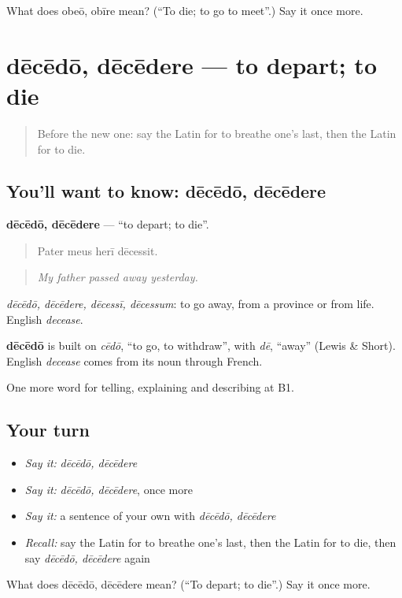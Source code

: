 \begin{tcolorbox}[breakable,colback=teal!4,colframe=teal!35!black,title={Before you move on}]
What does obeō, obīre mean? (\textquotedblleft{}To die; to go to meet\textquotedblright{}.) Say it once more.
\end{tcolorbox}
\section[dēcēdō, dēcēdere]{dēcēdō, dēcēdere — to depart; to die}

\label{lesson:LA-C329-decedo}



\begin{quote}
Before the new one: say the Latin for to breathe one's last, then the Latin for to die.
\end{quote}

\subsection*{You'll want to know: dēcēdō, dēcēdere}
\textbf{dēcēdō, dēcēdere} — \textquotedblleft{}to depart; to die\textquotedblright{}.

\begin{quote}
Pater meus herī dēcessit.
\end{quote}

\begin{quote}
\emph{My father passed away yesterday.}
\end{quote}

\emph{dēcēdō, dēcēdere, dēcessī, dēcessum}: to go away, from a province or from life. English \emph{decease}.

\begin{cousinweb}
\textbf{dēcēdō} is built on \emph{cēdō}, \textquotedblleft{}to go, to withdraw\textquotedblright{}, with \emph{dē}, \textquotedblleft{}away\textquotedblright{} (Lewis \& Short). English \emph{decease} comes from its noun through French.
\end{cousinweb}

\begin{grammarlens}[title={What you've built}]
One more word for telling, explaining and describing at B1.
\end{grammarlens}

\subsection*{Your turn}
\begin{itemize}
\raggedright
  \item \emph{Say it:} \emph{dēcēdō, dēcēdere}
  \item \emph{Say it:} \emph{dēcēdō, dēcēdere}, once more
  \item \emph{Say it:} a sentence of your own with \emph{dēcēdō, dēcēdere}
  \item \emph{Recall:} say the Latin for to breathe one's last, then the Latin for to die, then say \emph{dēcēdō, dēcēdere} again
\end{itemize}

\begin{tcolorbox}[breakable,colback=teal!4,colframe=teal!35!black,title={Before you move on}]
What does dēcēdō, dēcēdere mean? (\textquotedblleft{}To depart; to die\textquotedblright{}.) Say it once more.
\end{tcolorbox}
